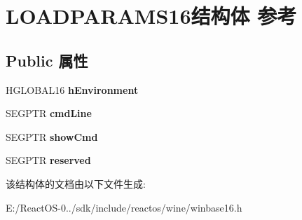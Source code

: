\hypertarget{struct_l_o_a_d_p_a_r_a_m_s16}{}\section{L\+O\+A\+D\+P\+A\+R\+A\+M\+S16结构体 参考}
\label{struct_l_o_a_d_p_a_r_a_m_s16}
\subsection*{Public 属性}
\begin{DoxyCompactItemize}
\item 
\mbox{\label{struct_l_o_a_d_p_a_r_a_m_s16_a466c07dbd959fb08d5441723f3096992}} 
H\+G\+L\+O\+B\+A\+L16 {\bfseries h\+Environment}
\item 
\mbox{\label{struct_l_o_a_d_p_a_r_a_m_s16_ada2e1c8e970241e8b1993bf549348043}} 
S\+E\+G\+P\+TR {\bfseries cmd\+Line}
\item 
\mbox{\label{struct_l_o_a_d_p_a_r_a_m_s16_a817c38e3a3a19428ba044443b6d7a56e}} 
S\+E\+G\+P\+TR {\bfseries show\+Cmd}
\item 
\mbox{\label{struct_l_o_a_d_p_a_r_a_m_s16_ad26603aaaf4e8a0e722cc705b8ac2fea}} 
S\+E\+G\+P\+TR {\bfseries reserved}
\end{DoxyCompactItemize}


该结构体的文档由以下文件生成\+:\begin{DoxyCompactItemize}
\item 
E\+:/\+React\+O\+S-\/0../sdk/include/reactos/wine/winbase16.\+h\end{DoxyCompactItemize}
